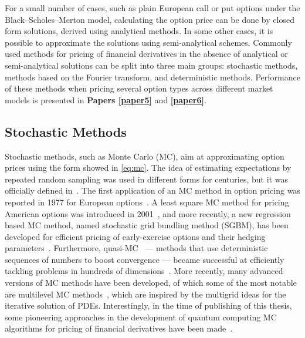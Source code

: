 \documentclass{UUThesisTemplate}
\begin{document}
\par
For a small number of cases, such as plain European call or put options under the Black--Scholes--Merton model, calculating the option price can be done by closed form solutions, derived using analytical methods. In some other cases, it is possible to approximate the solutions using semi-analytical schemes. Commonly used methods for pricing of financial derivatives in the absence of analytical or semi-analytical solutions can be split into three main groups: stochastic methods, methods based on the Fourier transform, and deterministic methods. Performance of these methods when pricing several option types across different market models is presented in \textbf{Papers \ref{paper5}} and \textbf{\ref{paper6}}.%



%



%
\subsection{Stochastic Methods}

\par
Stochastic methods, such as Monte Carlo (MC), aim at approximating option prices using the form showed in \eqref{eq:mc}. The idea of estimating expectations by repeated random sampling was used in different forms for centuries, but it was officially defined in~\cite{metropolis1949monte}. The first application of an MC method in option pricing was reported in 1977 for European options~\cite{boyle1977options}. A least square MC method for pricing American options was introduced in 2001~\cite{longstaff2001valuing}, and more recently, a new regression based MC method, named stochastic grid bundling method (SGBM), has been developed for efficient pricing of early-exercise options and their hedging parameters~\cite{jain2015stochastic}. Furthermore, quasi-MC~\cite{paskov1995faster} --- methods that use deterministic sequences of numbers to boost convergence --- became successful at efficiently tackling problems in hundreds of dimensions~\cite{dick2013high}. More recently, many advanced versions of MC methods have been developed, of which some of the most notable are multilevel MC methods~\cite{giles2008multilevel}, which are inspired by the multigrid ideas for the iterative solution of PDEs. %
Interestingly, in the time of publishing of this thesis, some pioneering approaches in the development of quantum computing MC algorithms for pricing of financial derivatives have been made~\cite{rebentrost2018quantum}.
\end{document}
